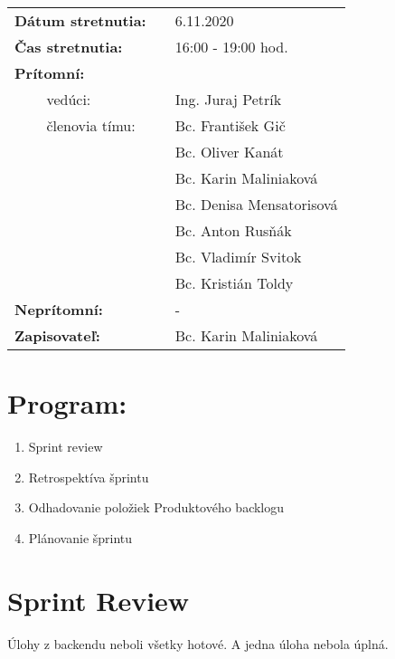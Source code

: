 \documentclass{article}
\begin{document}
    

    \begin{table}[h]
        \begin{tabular}{lllll}
            \multicolumn{3}{l}{\textbf{Dátum stretnutia:}} & & 6.11.2020 \\
            \multicolumn{3}{l}{\textbf{Čas stretnutia:}} & & 16:00 - 19:00 hod. \\
            \multicolumn{3}{l}{\textbf{Prítomní:}} \\
            & & vedúci: & & Ing. Juraj Petrík \\
            & & členovia tímu: & & Bc. František Gič  \\
            & & & & Bc. Oliver Kanát \\
            & & & & Bc. Karin Maliniaková \\
            & & & & Bc. Denisa Mensatorisová \\
            & & & & Bc. Anton Rusňák \\
            & & & & Bc. Vladimír Svitok \\
            & & & & Bc. Kristián Toldy \\
            \multicolumn{3}{l}{\textbf{Neprítomní:}} & & -\\
            \multicolumn{3}{l}{\textbf{Zapisovateľ:}} & & Bc. Karin Maliniaková \\
        \end{tabular}
        \label{tab:grades}
    \end{table}

    \section*{Program:}

    \begin{enumerate}
        \item Sprint review
        \item Retrospektíva šprintu 
        \item Odhadovanie položiek Produktového backlogu
        \item Plánovanie šprintu
    \end{enumerate}

    \section*{Sprint Review}

        \textnormal {Úlohy z backendu neboli všetky hotové. A jedna úloha nebola úplná. }
\end{document}
